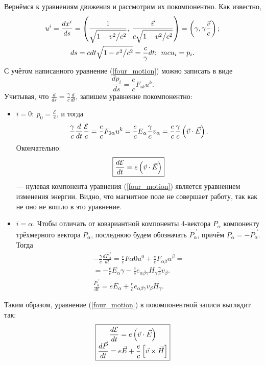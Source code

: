     Вернёмся к уравнениям движения и рассмотрим их покомпонентно. Как известно,
    \begin{gather*}
        u^i = \frac{dx^i}{ds} = \left({\frac{1}{\sqrt{1 - v^2 \big/ c^2}}, \: \frac{\vec{v}}{c\sqrt{1 - v^2 \big/ c^2}}}\right) = \left({\gamma, \gamma\frac{\vec{v}}{c}}\right);\\
        ds = cdt\sqrt{1 - v^2 \big/ c^2} = \frac{c}{\gamma}dt; \: \: mcu_i = p_i.
    \end{gather*}
    С учётом написанного уравнение (\ref{four_motion}) можно записать в виде
    \[
        \frac{dp_i}{ds} = \frac ec F_{ik}u^k.
    \]
    Учитывая, что $\displaystyle \frac{d}{ds} = \frac{\gamma}{c}\frac{d}{dt}$, запишем уравнение покомпонентно:
    \begin{itemize}
        \item $i = 0: \: p_0 = \frac{\mathcal{E}}{c}$, и тогда
        \[
            \frac{\gamma}{c} \frac{d}{dt} \frac{\mathcal{E}}{c} = \frac ec F_{0\alpha} u^k = 
            \frac ec E_{\alpha} \frac{\gamma}{c} v_{\alpha} = \frac ec \frac{\gamma}{c}\left({\vec{v}\cdot\vec{E}}\right).
        \]
        Окончательно:
        \begin{equation}
            \boxed{\frac{d\mathcal{E}}{dt} = e\left({\vec{v}\cdot\vec{E}}\right)} \label{de_dt}
        \end{equation}
        --- нулевая компонента уравнения (\ref{four_motion}) является уравнением изменения энергии. Видно, что магнитное поле не совершает работу,
        так как не оно не вошло в это уравнение.

        \item $i = \alpha$. Чтобы отличать от ковариантной компоненты 4-вектора $P_{\alpha}$ компоненту трёхмерного вектора $P_{\alpha}$,
        последнюю будем обозначать $\vec{P_{\alpha}}$, причём $P_{\alpha} = -\vec{P_{\alpha}}$. Тогда
        \begin{gather*}
            -\frac{\gamma}{c} \frac{d \vec{P_{\alpha}}}{dt} = \frac ec F{\alpha 0}u^0  + \frac ec F_{\alpha \beta} u^{\beta} = \\
            = -\frac ec E_{\alpha}\gamma - \frac ec e_{\alpha \beta \gamma}H_{\gamma}\frac{\gamma}{c} v_{\beta}. \\
            \frac{\vec{P_{\alpha}}}{dt} = eE_{\alpha} + \frac ec e_{\alpha\beta\gamma}v_{\beta}H_{\gamma}.
        \end{gather*}
    \end{itemize}
    Таким образом, уравнение (\ref{four_motion}) в покомпонентной записи выглядит так:
    \[
        \boxed{
            \begin{matrix}
                \displaystyle \frac{d\mathcal{E}}{dt} = e \left({\vec{v}\cdot\vec{E}}\right) \\
                \displaystyle \frac{d\vec{P}}{dt} = e\vec{E} + \frac ec \left[{\vec{v}\times\vec{H}}\right]
            \end{matrix}
        }
    \]

